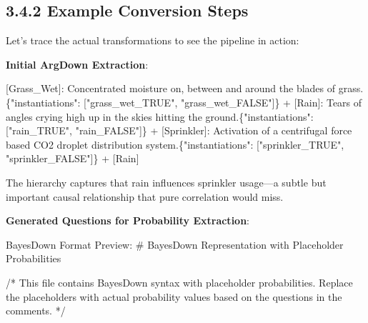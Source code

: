 \documentclass[
  11pt,
  letterpaper,
  openany]{book}
\newenvironment{Shaded}{\begin{snugshade}}{\end{snugshade}}
\newcommand{\CommentTok}[1]{\textcolor[rgb]{0.37,0.37,0.37}{#1}}
\newcommand{\ErrorTok}[1]{\textcolor[rgb]{0.68,0.00,0.00}{#1}}
\newcommand{\NormalTok}[1]{\textcolor[rgb]{0.00,0.23,0.31}{#1}}
\newcommand{\OtherTok}[1]{\textcolor[rgb]{0.00,0.23,0.31}{#1}}
\newcommand{\SpecialStringTok}[1]{\textcolor[rgb]{0.13,0.47,0.30}{#1}}
\begin{document}
\begin{landscape}

\subsection{3.4.2 Example Conversion Steps}\label{sec-rsg-input}

Let's trace the actual transformations to see the pipeline in action:

\textbf{Initial ArgDown Extraction}:

\begin{Shaded}
\begin{Highlighting}[]
\OtherTok{[Grass\_Wet]: }\NormalTok{Concentrated moisture on, between and around the blades of grass.\{"instantiations": }\CommentTok{[}\OtherTok{"grass\_wet\_TRUE", "grass\_wet\_FALSE"}\CommentTok{]}\NormalTok{\}    }
\SpecialStringTok{  + }\CommentTok{[}\OtherTok{Rain}\CommentTok{]}\NormalTok{: Tears of angles crying high up in the skies hitting the ground.\{"instantiations": }\CommentTok{[}\OtherTok{"rain\_TRUE", "rain\_FALSE"}\CommentTok{]}\NormalTok{\}}
\SpecialStringTok{  + }\CommentTok{[}\OtherTok{Sprinkler}\CommentTok{]}\NormalTok{: Activation of a centrifugal force based CO2 droplet distribution system.\{"instantiations": }\CommentTok{[}\OtherTok{"sprinkler\_TRUE", "sprinkler\_FALSE"}\CommentTok{]}\NormalTok{\}}
\SpecialStringTok{      + }\CommentTok{[}\OtherTok{Rain}\CommentTok{]}
\end{Highlighting}
\end{Shaded}

The hierarchy captures that rain influences sprinkler usage---a subtle
but important causal relationship that pure correlation would miss.

\textbf{Generated Questions for Probability Extraction}:

\begin{Shaded}
\begin{Highlighting}[]
\ErrorTok{BayesDown} \ErrorTok{Format} \ErrorTok{Preview:}
\ErrorTok{\#} \ErrorTok{BayesDown} \ErrorTok{Representation} \ErrorTok{with} \ErrorTok{Placeholder} \ErrorTok{Probabilities}

\ErrorTok{/*} \ErrorTok{This} \ErrorTok{file} \ErrorTok{contains} \ErrorTok{BayesDown} \ErrorTok{syntax} \ErrorTok{with} \ErrorTok{placeholder} \ErrorTok{probabilities.}
   \ErrorTok{Replace} \ErrorTok{the} \ErrorTok{placeholders} \ErrorTok{with} \ErrorTok{actual} \ErrorTok{probability} \ErrorTok{values} \ErrorTok{based} \ErrorTok{on} \ErrorTok{the} 
   \ErrorTok{questions} \ErrorTok{in} \ErrorTok{the} \ErrorTok{comments.} \ErrorTok{*/}


\end{Highlighting}
\end{Shaded}
\end{landscape}
\end{document}

